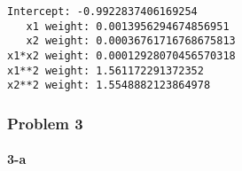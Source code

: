 \documentclass[11pt]{article}
\begin{document}
    \begin{Verbatim}[commandchars=\\\{\}]
   Intercept: -0.9922837406169254
   x1 weight: 0.0013956294674856951
   x2 weight: 0.00036761716768675813
x1*x2 weight: 0.00012928070456570318
x1**2 weight: 1.561172291372352
x2**2 weight: 1.5548882123864978
    \end{Verbatim}

    \subsubsection{Problem 3}\label{problem-3}

\paragraph{3-a}\label{a}
\end{document}
